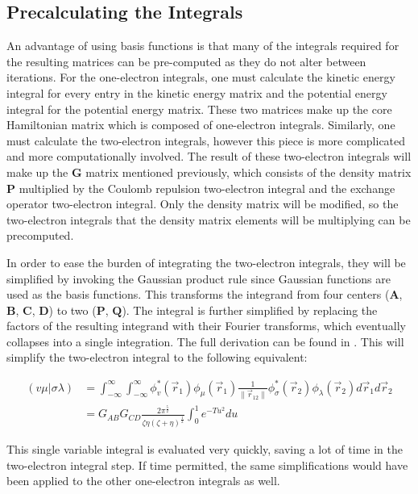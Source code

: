 \documentclass[10pt, oneside, letterpaper]{article}
\begin{document}
\subsection{Precalculating the Integrals}

An advantage of using basis functions is that many of the integrals required for the resulting matrices can be pre-computed as they do not alter between iterations. For the one-electron integrals, one must calculate the kinetic energy integral for every entry in the kinetic energy matrix and the potential energy integral for the potential energy matrix. These two matrices make up the core Hamiltonian matrix which is composed of one-electron integrals. Similarly, one must calculate the two-electron integrals, however this piece is more complicated and more computationally involved. The result of these two-electron integrals will make up the $\bm{G}$ matrix mentioned previously, which consists of the density matrix $\bm{P}$ multiplied by the Coulomb repulsion two-electron integral and the exchange operator two-electron integral. Only the density matrix will be modified, so the two-electron integrals that the density matrix elements will be multiplying can be precomputed.

In order to ease the burden of integrating the two-electron integrals, they will be simplified by invoking the Gaussian product rule since Gaussian functions are used as the basis functions. This transforms the integrand from four centers ($\bm{A}$, $\bm{B}$, $\bm{C}$, $\bm{D}$) to two ($\bm{P}$, $\bm{Q}$). The integral is further simplified by replacing the factors of the resulting integrand with their Fourier transforms, which eventually collapses into a single integration. The full derivation can be found in \cite[p.~153-155,157]{molecular-integrals-over-gaussian-basis-functions}. This will simplify the two-electron integral to the following equivalent:

\begin{align*}
  (v\mu|\sigma\lambda) &= \int_{-\infty}^{\infty}\int_{-\infty}^{\infty}  \phi_v^\ast(\vec{r}_1)\phi_\mu(\vec{r}_1) \frac{1}{\|\vec{r}_{12}\|}  \phi_\sigma^\ast(\vec{r}_2)\phi_\lambda(\vec{r}_2)  d\vec{r}_1d\vec{r}_2 \\
  &= G_{AB}G_{CD}\frac{2\pi^{\frac{5}{2}}}{\zeta\eta(\zeta + \eta)^{\frac{1}{2}}} \int_{0}^{1}e^{-Tu^2}du
\end{align*}

This single variable integral is evaluated very quickly, saving a lot of time in the two-electron integral step. If time permitted, the same simplifications would have been applied to the other one-electron integrals as well.
\end{document}
